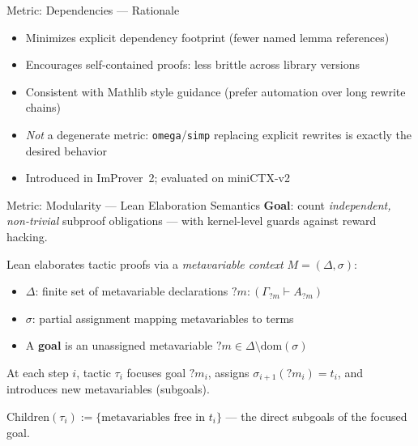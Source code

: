 \documentclass{beamer}
\begin{document}
\begin{frame}{Metric: Dependencies --- Rationale}
\vspace{0.8em}
\begin{itemize}\setlength{\itemsep}{12pt}
  \item Minimizes explicit dependency footprint (fewer named lemma references)
  \item Encourages self-contained proofs: less brittle across library versions
  \item Consistent with Mathlib style guidance (prefer automation over long rewrite chains)
  \item \emph{Not} a degenerate metric: \texttt{omega}/\texttt{simp} replacing explicit rewrites is exactly the desired behavior
  \item Introduced in ImProver~2; evaluated on miniCTX-v2
\end{itemize}
\end{frame}

\begin{frame}{Metric: Modularity --- Lean Elaboration Semantics}
\vspace{0.2em}
\textbf{Goal}: count \emph{independent, non-trivial} subproof obligations --- with kernel-level guards against reward hacking.
\vspace{0.2em}

Lean elaborates tactic proofs via a \emph{metavariable context} $M = (\Delta, \sigma)$:
\begin{itemize}\setlength{\itemsep}{3pt}
  \item $\Delta$: finite set of metavariable declarations $?m : (\Gamma_{?m} \vdash A_{?m})$
  \item $\sigma$: partial assignment mapping metavariables to terms
  \item A \textbf{goal} is an unassigned metavariable $?m \in \Delta \setminus \mathrm{dom}(\sigma)$
\end{itemize}
\vspace{0.2em}
At each step $i$, tactic $\tau_i$ focuses goal $?m_i$, assigns $\sigma_{i+1}(?m_i) = t_i$, and introduces new metavariables (subgoals).
\vspace{0.3em}
\begin{definition}
$\mathrm{Children}(\tau_i) := \{\text{metavariables free in } t_i\}$ --- the direct subgoals of the focused goal.
\end{definition}
\end{frame}
\end{document}
